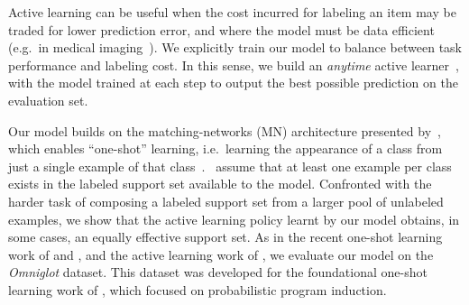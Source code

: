 %
%
%
% 
%
Active learning can be useful when the cost incurred for labeling an item may be traded for lower prediction error, and where the model must be data efficient (e.g.~in medical imaging~\citep{medical}). We explicitly train our model to balance between task performance and labeling cost. In this sense, we build an \emph{anytime} active learner~\cite{zilberstein1996using}, with the model trained at each step to output the best possible prediction on the evaluation set.

Our model builds on the matching-networks (MN) architecture presented by~\citet{vinyals2016matching}, which enables ``one-shot'' learning, i.e.~learning the appearance of a class from just a single example of that class~\cite{santoro2016one,koch2015siamese}.~\citet{vinyals2016matching} assume that at least one example per class exists in the labeled support set available to the model. Confronted with the harder task of composing a labeled support set from a larger pool of unlabeled examples, we show that the active learning policy learnt by our model obtains, in some cases, an equally effective support set. As in the recent one-shot learning work of \citet{santoro2016one} and \citet{vinyals2016matching}, and the active learning work of \citet{activeoneshot}, we evaluate our model on the \emph{Omniglot} dataset. This dataset was developed for the foundational one-shot learning work of \citet{lake2015human}, which focused on probabilistic program induction.


